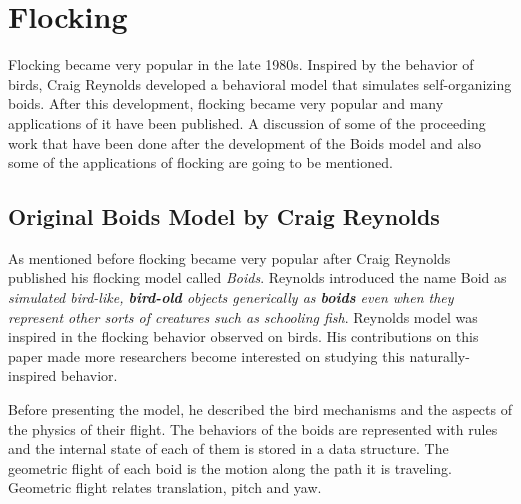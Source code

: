 





\section{Flocking}
Flocking became very popular in the late 1980s. Inspired by the behavior of birds, Craig Reynolds developed a behavioral model that simulates self-organizing boids. After this development, flocking became very popular and many applications of it have been published. A discussion of some of the proceeding work that have been done after the development of the Boids model and also some of the applications of flocking are going to be mentioned.

\subsection{Original Boids Model by Craig Reynolds}
As mentioned before flocking became very popular after Craig Reynolds published his flocking model called \textit{Boids}\cite{craig1}. Reynolds introduced the name Boid as \textit{simulated bird-like, \textbf{bird-old} objects generically as \textbf{boids} even when they represent other sorts of creatures such as schooling fish}. Reynolds model was inspired in the flocking behavior observed on birds. His contributions on this paper made more researchers become interested on studying this naturally-inspired behavior.

Before presenting the model, he described the bird mechanisms and the aspects of the physics of their flight. The behaviors of the boids are represented with rules and the internal state of each of them is stored in a data structure. The geometric flight of each boid is the motion along the path it is traveling. Geometric flight relates translation, pitch and yaw. 

